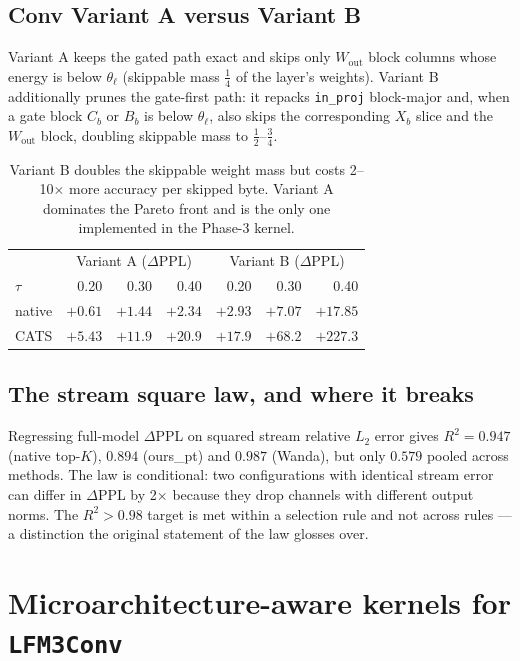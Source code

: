 \documentclass[11pt]{article}
\newcommand{\Wout}{\ensuremath{W_{\mathrm{out}}}}
\newcommand{\thetal}{\theta_\ell}
\newcommand{\code}[1]{\texttt{\small #1}}
\begin{document}
\subsection{Conv Variant A versus Variant B}
Variant A keeps the gated path exact and skips only \Wout{} block columns whose energy is
below $\thetal$ (skippable mass $\tfrac14$ of the layer's weights). Variant B additionally
prunes the gate-first path: it repacks \code{in\_proj} block-major and, when a gate block
$C_b$ or $B_b$ is below $\thetal$, also skips the corresponding $X_b$ slice and the
\Wout{} block, doubling skippable mass to $\tfrac12$--$\tfrac34$.
\begin{table}[h]\centering\small
\begin{tabular}{lrrrrrr}
\toprule
 & \multicolumn{3}{c|}{Variant A ($\Delta$PPL)} & \multicolumn{3}{c}{Variant B ($\Delta$PPL)}\\
$\tau$ & 0.20 & 0.30 & 0.40 & 0.20 & 0.30 & 0.40 \\
\midrule
native & $+0.61$ & $+1.44$ & $+2.34$ & $+2.93$ & $+7.07$ & $+17.85$ \\
CATS   & $+5.43$ & $+11.9$ & $+20.9$ & $+17.9$ & $+68.2$ & $+227.3$ \\
\bottomrule
\end{tabular}
\caption{Variant B doubles the skippable weight mass but costs 2--10$\times$ more accuracy
per skipped byte. Variant A dominates the Pareto front and is the only one implemented in
the Phase-3 kernel.}
\end{table}

\subsection{The stream square law, and where it breaks}
Regressing full-model $\Delta$PPL on squared stream relative $L_2$ error gives
$R^2 = 0.947$ (native top-$K$), $0.894$ (ours\_pt) and $0.987$ (Wanda), but only
$0.579$ pooled across methods. The law is conditional: two configurations with identical
stream error can differ in $\Delta$PPL by 2$\times$ because they drop channels with
different output norms. The $R^2 > 0.98$ target is met within a selection rule and not
across rules --- a distinction the original statement of the law glosses over.

\section{Microarchitecture-aware kernels for \code{LFM3Conv}}
\end{document}
